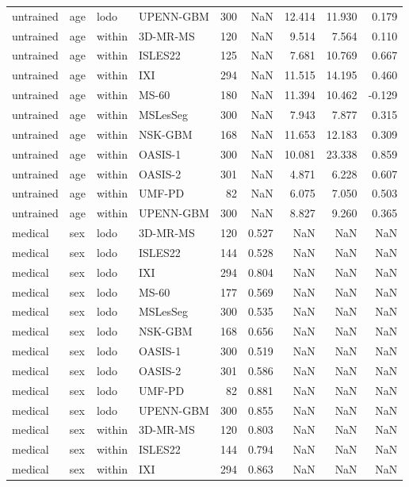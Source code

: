 \begin{tabular}{llllrrrrr}
untrained & age & lodo & UPENN-GBM & 300 & NaN & 12.414 & 11.930 & 0.179 \\
untrained & age & within & 3D-MR-MS & 120 & NaN & 9.514 & 7.564 & 0.110 \\
untrained & age & within & ISLES22 & 125 & NaN & 7.681 & 10.769 & 0.667 \\
untrained & age & within & IXI & 294 & NaN & 11.515 & 14.195 & 0.460 \\
untrained & age & within & MS-60 & 180 & NaN & 11.394 & 10.462 & -0.129 \\
untrained & age & within & MSLesSeg & 300 & NaN & 7.943 & 7.877 & 0.315 \\
untrained & age & within & NSK-GBM & 168 & NaN & 11.653 & 12.183 & 0.309 \\
untrained & age & within & OASIS-1 & 300 & NaN & 10.081 & 23.338 & 0.859 \\
untrained & age & within & OASIS-2 & 301 & NaN & 4.871 & 6.228 & 0.607 \\
untrained & age & within & UMF-PD & 82 & NaN & 6.075 & 7.050 & 0.503 \\
untrained & age & within & UPENN-GBM & 300 & NaN & 8.827 & 9.260 & 0.365 \\
medical & sex & lodo & 3D-MR-MS & 120 & 0.527 & NaN & NaN & NaN \\
medical & sex & lodo & ISLES22 & 144 & 0.528 & NaN & NaN & NaN \\
medical & sex & lodo & IXI & 294 & 0.804 & NaN & NaN & NaN \\
medical & sex & lodo & MS-60 & 177 & 0.569 & NaN & NaN & NaN \\
medical & sex & lodo & MSLesSeg & 300 & 0.535 & NaN & NaN & NaN \\
medical & sex & lodo & NSK-GBM & 168 & 0.656 & NaN & NaN & NaN \\
medical & sex & lodo & OASIS-1 & 300 & 0.519 & NaN & NaN & NaN \\
medical & sex & lodo & OASIS-2 & 301 & 0.586 & NaN & NaN & NaN \\
medical & sex & lodo & UMF-PD & 82 & 0.881 & NaN & NaN & NaN \\
medical & sex & lodo & UPENN-GBM & 300 & 0.855 & NaN & NaN & NaN \\
medical & sex & within & 3D-MR-MS & 120 & 0.803 & NaN & NaN & NaN \\
medical & sex & within & ISLES22 & 144 & 0.794 & NaN & NaN & NaN \\
medical & sex & within & IXI & 294 & 0.863 & NaN & NaN & NaN \\

\end{tabular}
